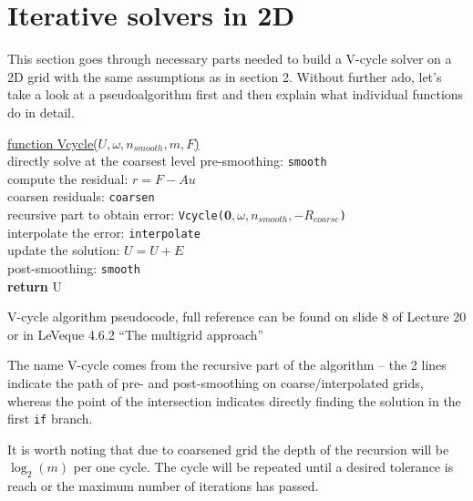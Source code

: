 \documentclass[main.tex]{subfiles}
\begin{document}
    
\section{Iterative solvers in 2D}

This section goes through necessary parts needed to build a V-cycle solver on a 2D grid with the same assumptions as in section 2. Without further ado, let's take a look at a pseudoalgorithm first and then explain what individual functions do in detail.
\begin{algorithm}[h]
    \underline{function Vcycle($U, \omega, n_{smooth}, m, F$)}\\
    {
        directly solve at the coarsest level
    }
    {
        pre-smoothing: \texttt{smooth}\\
        compute the residual: $r = F - A u$\\
        coarsen residuals: \texttt{coarsen}\\
        recursive part to obtain error: \texttt{Vcycle($\mathbf{0}, \omega, n_{smooth}, -R_{coarse}$)}\\
        interpolate the error: \texttt{interpolate}\\
        update the solution: $U = U + E$\\
        post-smoothing: \texttt{smooth}\\
    }
    \textbf{return} U
    \caption{V-cycle algorithm pseudocode, full reference can be found on slide 8 of Lecture 20 or in LeVeque 4.6.2 ``The multigrid approach''}
\end{algorithm}
The name V-cycle comes from the recursive part of the algorithm -- the 2 lines indicate the path of pre- and post-smoothing on coarse/interpolated grids, whereas the point of the intersection indicates directly finding the solution in the first \texttt{if} branch.

It is worth noting that due to coarsened grid the depth of the recursion will be $\log_2(m)$ per one cycle. The cycle will be repeated until a desired tolerance is reach or the maximum number of iterations has passed.
\end{document}
